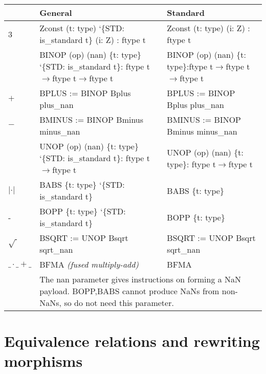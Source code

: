 \documentclass[article]{memoir}
\begin{document}
\noindent\begin{tabular}{@{}l | p{2.9in}| p{2.0in} |@{}}
  & \textbf{General} & \textbf{Standard} \\ \hline
3 & \small \textsf{Zconst (t: type) `\{STD: is\_standard t\} (i: Z) : ftype t}
  & \small \textsf{Zconst (t: type) (i: Z) : ftype t} \\ \hline
  & \small \textsf{BINOP (op) (nan) \{t: type\} `\{STD: is\_standard t\}:\newline\hspace*{.4in} ftype t$\rightarrow$ftype t$\rightarrow$ftype t}
  & \small \textsf{BINOP (op) (nan) \{t: type\}:\newline\hspace*{.4in}ftype t$\rightarrow$ftype t$\rightarrow$ftype t} \\
$+$ & \small \textsf{BPLUS := BINOP Bplus plus\_nan} & \small \textsf{BPLUS := BINOP Bplus plus\_nan} \\
$-$ & \small \textsf{BMINUS := BINOP Bminus minus\_nan} & \small \textsf{BMINUS := BINOP Bminus minus\_nan} \\ \hline
  & \small \textsf{UNOP (op) (nan) \{t: type\} `\{STD: is\_standard t\}:\newline\hspace*{.4in} ftype t$\rightarrow$ftype t}
  & \small \textsf{UNOP (op) (nan) \{t: type\}:\newline\hspace*{.4in} ftype t$\rightarrow$ftype t} \\

$|\cdot |$ & \small \textsf{BABS \{t: type\} `\{STD: is\_standard t\}} & \small \textsf{BABS \{t: type\}} \\
-  & \small \textsf{BOPP \{t: type\} `\{STD: is\_standard t\}} & \small \textsf{BOPP \{t: type\}} \\
$\sqrt{~}$ & \small \textsf{BSQRT := UNOP Bsqrt sqrt\_nan} & \small \textsf{BSQRT := UNOP Bsqrt sqrt\_nan} \\ \hline
$\_ \cdot \_ + \_$ & \small \textsf{BFMA} \emph{(fused multiply-add)} & \small \textsf{BFMA} \\ \hline
& \multicolumn{2}{p{4.9in}|}{\small The \textsf{nan} parameter gives instructions on forming a NaN payload.  \textsf{BOPP,BABS}
  cannot produce NaNs from non-NaNs, so do not need this parameter.} \\
\end{tabular}

\chapter{Equivalence relations and rewriting morphisms}
\label{morphisms}
\end{document}
